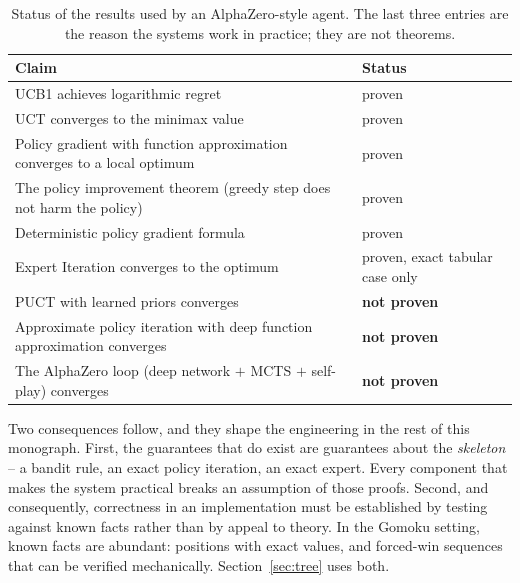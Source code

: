 \begin{table}[t]
\centering
\small
\caption{Status of the results used by an AlphaZero-style agent. The last three
entries are the reason the systems work in practice; they are not theorems.}
\label{tab:proven}
\begin{tabularx}{\textwidth}{@{}X l@{}}
\toprule
Claim & Status \\
\midrule
UCB1 achieves logarithmic regret \citep{auer2002ucb1} & proven \\
UCT converges to the minimax value \citep{kocsis2006uct} & proven \\
Policy gradient with function approximation converges to a local
optimum \citep{sutton2000policygradient} & proven \\
The policy improvement theorem (greedy step does not harm the policy)
\citep{suttonbarto2018} & proven \\
Deterministic policy gradient formula \citep{silver2014dpg} & proven \\
Expert Iteration converges to the optimum \citep{anthony2017exit} & proven,
exact tabular case only \\
PUCT with learned priors converges & \textbf{not proven} \\
Approximate policy iteration with deep function approximation converges
& \textbf{not proven} \\
The AlphaZero loop (deep network $+$ MCTS $+$ self-play) converges
& \textbf{not proven} \\
\bottomrule
\end{tabularx}
\end{table}

Two consequences follow, and they shape the engineering in the rest of this
monograph. First, the guarantees that do exist are guarantees about the
\emph{skeleton} -- a bandit rule, an exact policy iteration, an exact expert.
Every component that makes the system practical breaks an assumption of those
proofs. Second, and consequently, correctness in an implementation must be
established by testing against known facts rather than by appeal to theory. In
the Gomoku setting, known facts are abundant: positions with exact values, and
forced-win sequences that can be verified mechanically. Section~\ref{sec:tree}
uses both.
